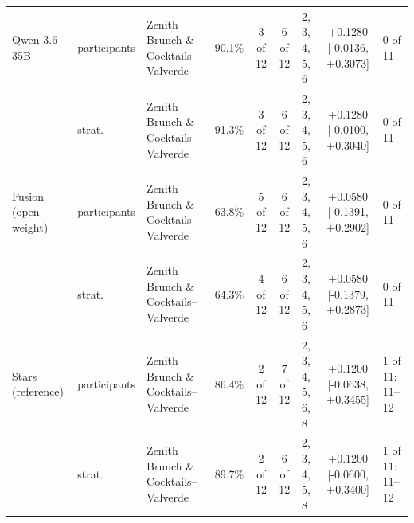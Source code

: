 \begin{table}[htbp]
{\begin{tabular}{lllccclcl}
  Qwen 3.6 35B & participants & Zenith Brunch \& Cocktails--Valverde & 90.1\% & 3 of 12 & 6 of 12 & 2, 3, 4, 5, 6 & +0.1280 [-0.0136, +0.3073] & 0 of 11 \\
   & strat. & Zenith Brunch \& Cocktails--Valverde & 91.3\% & 3 of 12 & 6 of 12 & 2, 3, 4, 5, 6 & +0.1280 [-0.0100, +0.3040] & 0 of 11 \\
  Fusion (open-weight) & participants & Zenith Brunch \& Cocktails--Valverde & 63.8\% & 5 of 12 & 6 of 12 & 2, 3, 4, 5, 6 & +0.0580 [-0.1391, +0.2902] & 0 of 11 \\
   & strat. & Zenith Brunch \& Cocktails--Valverde & 64.3\% & 4 of 12 & 6 of 12 & 2, 3, 4, 5, 6 & +0.0580 [-0.1379, +0.2873] & 0 of 11 \\
  Stars (reference) & participants & Zenith Brunch \& Cocktails--Valverde & 86.4\% & 2 of 12 & 7 of 12 & 2, 3, 4, 5, 6, 8 & +0.1200 [-0.0638, +0.3455] & 1 of 11: 11--12 \\
   & strat. & Zenith Brunch \& Cocktails--Valverde & 89.7\% & 2 of 12 & 6 of 12 & 2, 3, 4, 5, 8 & +0.1200 [-0.0600, +0.3400] & 1 of 11: 11--12 \\
\bottomrule
\end{tabular}%
}
\end{table}

